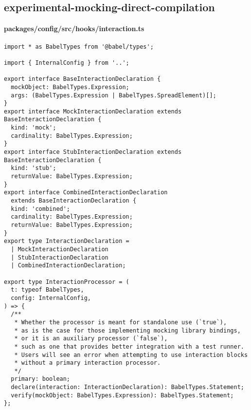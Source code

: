 \subsection*{experimental-mocking-direct-compilation}

\paragraph*{packages/config/src/hooks/interaction.ts}
\begin{verbatim}
import * as BabelTypes from '@babel/types';

import { InternalConfig } from '..';

export interface BaseInteractionDeclaration {
  mockObject: BabelTypes.Expression;
  args: (BabelTypes.Expression | BabelTypes.SpreadElement)[];
}
export interface MockInteractionDeclaration extends BaseInteractionDeclaration {
  kind: 'mock';
  cardinality: BabelTypes.Expression;
}
export interface StubInteractionDeclaration extends BaseInteractionDeclaration {
  kind: 'stub';
  returnValue: BabelTypes.Expression;
}
export interface CombinedInteractionDeclaration
  extends BaseInteractionDeclaration {
  kind: 'combined';
  cardinality: BabelTypes.Expression;
  returnValue: BabelTypes.Expression;
}
export type InteractionDeclaration =
  | MockInteractionDeclaration
  | StubInteractionDeclaration
  | CombinedInteractionDeclaration;

export type InteractionProcessor = (
  t: typeof BabelTypes,
  config: InternalConfig,
) => {
  /**
   * Whether the processor is meant for standalone use (`true`),
   * as is the case for those implementing mocking library bindings,
   * or it is an auxiliary processor (`false`),
   * such as one that provides better integration with a test runner.
   * Users will see an error when attempting to use interaction blocks
   * without a primary interaction processor.
   */
  primary: boolean;
  declare(interaction: InteractionDeclaration): BabelTypes.Statement;
  verify(mockObject: BabelTypes.Expression): BabelTypes.Statement;
};
\end{verbatim}

